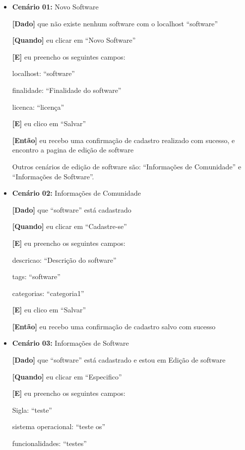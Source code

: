 \begin{itemize}
\item\textbf{Cenário 01:} Novo Software

	\textbf{[Dado]} que não existe nenhum software com o localhost ``software''

	\textbf{[Quando]} eu clicar em ``Novo Software''

	\textbf{[E]} eu preencho os seguintes campos: 

  		\subitem localhost: ``software''

  		\subitem finalidade: ``Finalidade do software''

  		\subitem licenca: ``licença''
  		
  		
	\textbf{[E]} eu clico em ``Salvar''

	\textbf{[Então]} eu recebo uma confirmação de cadastro realizado com sucesso, e encontro a pagina de edição de software


Outros cenários de edição de software são: ``Informações de Comunidade'' e ``Informações de Software''.

\item\textbf{Cenário 02:} Informações de Comunidade

	\textbf{[Dado]} que ``software'' está cadastrado

	\textbf{[Quando]} eu clicar em ``Cadastre-se''

	\textbf{[E]} eu preencho os seguintes campos: 

  		\subitem descricao: ``Descrição do software''

  		\subitem tags: ``software''

  		\subitem categorias: ``categoria1''
 
	\textbf{[E]} eu clico em ``Salvar''

	\textbf{[Então]} eu recebo uma confirmação de cadastro salvo com sucesso


\item\textbf{Cenário 03:} Informações de Software

	\textbf{[Dado]} que ``software'' está cadastrado e estou em Edição de software

	\textbf{[Quando]} eu clicar em ``Especifico''

	\textbf{[E]} eu preencho os seguintes campos: 

  		\subitem Sigla: ``teste''

  		\subitem sistema operacional: ``teste os''

  		\subitem funcionalidades: ``testes''


\end{itemize}

